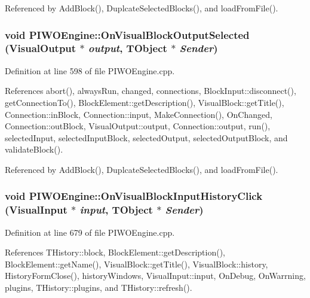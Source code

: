 Referenced by AddBlock(), DuplcateSelectedBlocks(), and loadFromFile().\hypertarget{classPIWOEngine_0b7e4c9ee82bab94f35d8cc5f6cda3f7}{
\subsubsection[OnVisualBlockOutputSelected]{\setlength{\rightskip}{0pt plus 5cm}void PIWOEngine::OnVisualBlockOutputSelected ({\bf VisualOutput} $\ast$ {\em output}, \/  TObject $\ast$ {\em Sender})}}
\label{classPIWOEngine_0b7e4c9ee82bab94f35d8cc5f6cda3f7}




Definition at line 598 of file PIWOEngine.cpp.

References abort(), alwaysRun, changed, connections, BlockInput::disconnect(), getConnectionTo(), BlockElement::getDescription(), VisualBlock::getTitle(), Connection::inBlock, Connection::input, MakeConnection(), OnChanged, Connection::outBlock, VisualOutput::output, Connection::output, run(), selectedInput, selectedInputBlock, selectedOutput, selectedOutputBlock, and validateBlock().

Referenced by AddBlock(), DuplcateSelectedBlocks(), and loadFromFile().\hypertarget{classPIWOEngine_1a54c292b17426a1690de0500a72d8fa}{
\subsubsection[OnVisualBlockInputHistoryClick]{\setlength{\rightskip}{0pt plus 5cm}void PIWOEngine::OnVisualBlockInputHistoryClick ({\bf VisualInput} $\ast$ {\em input}, \/  TObject $\ast$ {\em Sender})}}
\label{classPIWOEngine_1a54c292b17426a1690de0500a72d8fa}




Definition at line 679 of file PIWOEngine.cpp.

References THistory::block, BlockElement::getDescription(), BlockElement::getName(), VisualBlock::getTitle(), VisualBlock::history, HistoryFormClose(), historyWindows, VisualInput::input, OnDebug, OnWarrning, plugins, THistory::plugins, and THistory::refresh().

